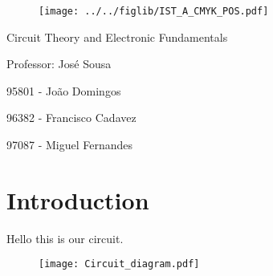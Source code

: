 \documentclass[11pt]{article}
\begin{document}
\begin{figure}[h]
	\centering
	\texttt{[image: ../../figlib/IST\_A\_CMYK\_POS.pdf]}
\end{figure}

\begin{center}
	\huge{Circuit Theory and Electronic Fundamentals}
	
	\large{Professor: José Sousa}
	
	\large{95801 - João Domingos}
	
	\large{96382 - Francisco Cadavez}
	
	\large{97087 - Miguel Fernandes}
\end{center}

\section{Introduction}
Hello this is our circuit.

\begin{figure}[h]
	\centering
	\texttt{[image: Circuit\_diagram.pdf]}
\end{figure}
\end{document}
